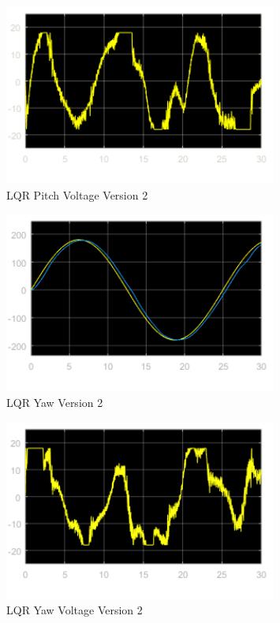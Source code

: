 \documentclass[fontsize=11pt, %
                             paper=letter, %
                             openany, %
                             captions=tableheading,
                             index=totoc,
                             hyperref]{labbook}
\begin{document}
\begin{addmargin}[0cm]{0cm}
\begin{figure}[H]
  \centering
  \includegraphics[width=0.8\textwidth]{figs/img/02212019/LQR_PitchVoltV2.png}
  \caption{LQR Pitch Voltage Version 2}
  \label{fig:LQR_PitchVoltV2}
\end{figure}

\begin{figure}[H]
  \centering
  \includegraphics[width=0.8\textwidth]{figs/img/02212019/LQR_YawV2.png}
  \caption{LQR Yaw Version 2}
  \label{fig:LQR_YawV2}
\end{figure}

\begin{figure}[H]
  \centering
  \includegraphics[width=0.8\textwidth]{figs/img/02212019/LQR_YawVoltV2.png}
  \caption{LQR Yaw Voltage Version 2}
  \label{fig:LQR_YawVoltV2}
\end{figure}


\end{addmargin}
\end{document}
